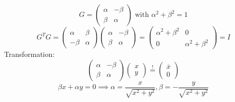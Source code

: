 \documentclass{article}
\begin{document}
\[ G = \begin{pmatrix} \alpha & -\beta \\ \beta & \alpha \end{pmatrix} \text{ with } \alpha^2 + \beta^2 = 1 \]
\[ G^T G = \begin{pmatrix} \alpha & \beta \\ -\beta & \alpha \end{pmatrix} \begin{pmatrix} \alpha & -\beta \\ \beta & \alpha \end{pmatrix} = \begin{pmatrix} \alpha^2 + \beta^2 & 0 \\ 0 & \alpha^2 + \beta^2 \end{pmatrix} = I \]
Transformation:
\[
  \begin{pmatrix}
    \alpha & -\beta \\
    \beta & \alpha
  \end{pmatrix} \begin{pmatrix}
    x \\ y
  \end{pmatrix}
  \stackrel{!}{=} \begin{pmatrix}
    \overline{x} \\ 0
  \end{pmatrix}
\]
\[ \beta x + \alpha y  = 0 \implies \alpha = \frac{x}{\sqrt{x^2 + y^2}}, \beta = -\frac{y}{\sqrt{x^2 + y^2}} \]
\end{document}
